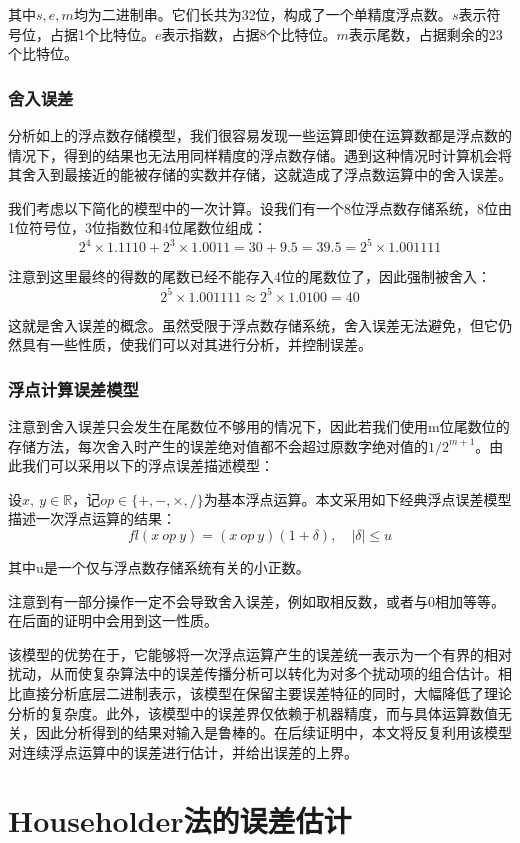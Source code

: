 \documentclass[UTF8,a4paper,openany]{ctexbook}
\begin{document}
其中$s, e, m$均为二进制串。它们长共为32位，构成了一个单精度浮点数。$s$表示符号位，占据1个比特位。$e$表示指数，占据8个比特位。$m$表示尾数，占据剩余的23个比特位。

\subsection{舍入误差}

分析如上的浮点数存储模型，我们很容易发现一些运算即使在运算数都是浮点数的情况下，得到的结果也无法用同样精度的浮点数存储。遇到这种情况时计算机会将其舍入到最接近的能被存储的实数并存储，这就造成了浮点数运算中的舍入误差。

我们考虑以下简化的模型中的一次计算。设我们有一个8位浮点数存储系统，8位由1位符号位，3位指数位和4位尾数位组成：
$$2^4\times1.1110+2^3\times1.0011=30+9.5=39.5=2^5\times1.001111$$

注意到这里最终的得数的尾数已经不能存入4位的尾数位了，因此强制被舍入：
$$2^5\times1.001111\approx2^5\times1.0100=40$$

这就是舍入误差的概念。虽然受限于浮点数存储系统，舍入误差无法避免，但它仍然具有一些性质，使我们可以对其进行分析，并控制误差。

\subsection{浮点计算误差模型}

注意到舍入误差只会发生在尾数位不够用的情况下，因此若我们使用m位尾数位的存储方法，每次舍入时产生的误差绝对值都不会超过原数字绝对值的$1/2^{m+1}$。由此我们可以采用以下的浮点误差描述模型：

设$x,\ y\in\mathbb{R}$，记$op\in\{+,-,\times,/\}$为基本浮点运算。本文采用如下经典浮点误差模型描述一次浮点运算的结果：
$$fl(x\ op\ y)=(x\ op\ y)(1+\delta),\quad |\delta|\le u$$

其中u是一个仅与浮点数存储系统有关的小正数。

注意到有一部分操作一定不会导致舍入误差，例如取相反数，或者与0相加等等。在后面的证明中会用到这一性质。

该模型的优势在于，它能够将一次浮点运算产生的误差统一表示为一个有界的相对扰动，从而使复杂算法中的误差传播分析可以转化为对多个扰动项的组合估计。相比直接分析底层二进制表示，该模型在保留主要误差特征的同时，大幅降低了理论分析的复杂度。此外，该模型中的误差界仅依赖于机器精度，而与具体运算数值无关，因此分析得到的结果对输入是鲁棒的。在后续证明中，本文将反复利用该模型对连续浮点运算中的误差进行估计，并给出误差的上界。

\chapter{Householder法的误差估计}
\end{document}
